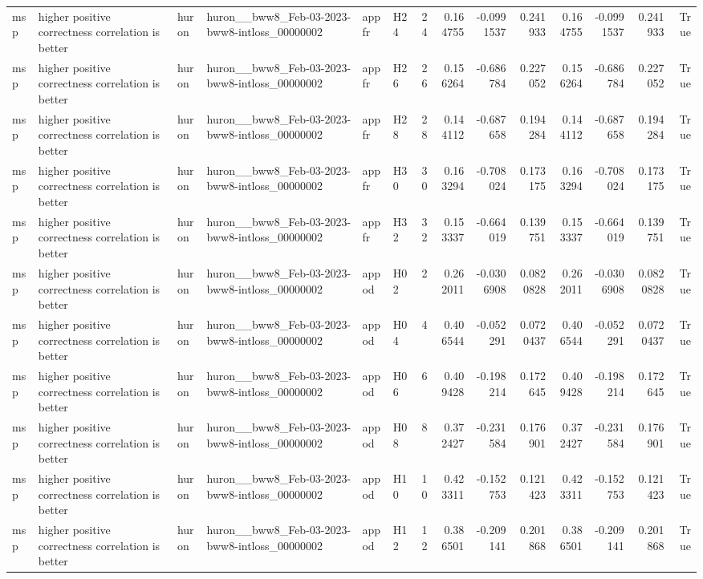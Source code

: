 \begin{longtable}{llllllrrrrrrrr}
msp & higher positive correctness correlation is better & huron & huron\_\_bww8\_Feb-03-2023-bww8-intloss\_00000002 & appfr & H24 & 24 & 0.164755 & -0.0991537 & 0.241933 & 0.164755 & -0.0991537 & 0.241933 & True \\
msp & higher positive correctness correlation is better & huron & huron\_\_bww8\_Feb-03-2023-bww8-intloss\_00000002 & appfr & H26 & 26 & 0.156264 & -0.686784 & 0.227052 & 0.156264 & -0.686784 & 0.227052 & True \\
msp & higher positive correctness correlation is better & huron & huron\_\_bww8\_Feb-03-2023-bww8-intloss\_00000002 & appfr & H28 & 28 & 0.144112 & -0.687658 & 0.194284 & 0.144112 & -0.687658 & 0.194284 & True \\
msp & higher positive correctness correlation is better & huron & huron\_\_bww8\_Feb-03-2023-bww8-intloss\_00000002 & appfr & H30 & 30 & 0.163294 & -0.708024 & 0.173175 & 0.163294 & -0.708024 & 0.173175 & True \\
msp & higher positive correctness correlation is better & huron & huron\_\_bww8\_Feb-03-2023-bww8-intloss\_00000002 & appfr & H32 & 32 & 0.153337 & -0.664019 & 0.139751 & 0.153337 & -0.664019 & 0.139751 & True \\
msp & higher positive correctness correlation is better & huron & huron\_\_bww8\_Feb-03-2023-bww8-intloss\_00000002 & appod & H02 & 2 & 0.262011 & -0.0306908 & 0.0820828 & 0.262011 & -0.0306908 & 0.0820828 & True \\
msp & higher positive correctness correlation is better & huron & huron\_\_bww8\_Feb-03-2023-bww8-intloss\_00000002 & appod & H04 & 4 & 0.406544 & -0.052291 & 0.0720437 & 0.406544 & -0.052291 & 0.0720437 & True \\
msp & higher positive correctness correlation is better & huron & huron\_\_bww8\_Feb-03-2023-bww8-intloss\_00000002 & appod & H06 & 6 & 0.409428 & -0.198214 & 0.172645 & 0.409428 & -0.198214 & 0.172645 & True \\
msp & higher positive correctness correlation is better & huron & huron\_\_bww8\_Feb-03-2023-bww8-intloss\_00000002 & appod & H08 & 8 & 0.372427 & -0.231584 & 0.176901 & 0.372427 & -0.231584 & 0.176901 & True \\
msp & higher positive correctness correlation is better & huron & huron\_\_bww8\_Feb-03-2023-bww8-intloss\_00000002 & appod & H10 & 10 & 0.423311 & -0.152753 & 0.121423 & 0.423311 & -0.152753 & 0.121423 & True \\
msp & higher positive correctness correlation is better & huron & huron\_\_bww8\_Feb-03-2023-bww8-intloss\_00000002 & appod & H12 & 12 & 0.386501 & -0.209141 & 0.201868 & 0.386501 & -0.209141 & 0.201868 & True \\

\end{longtable}
